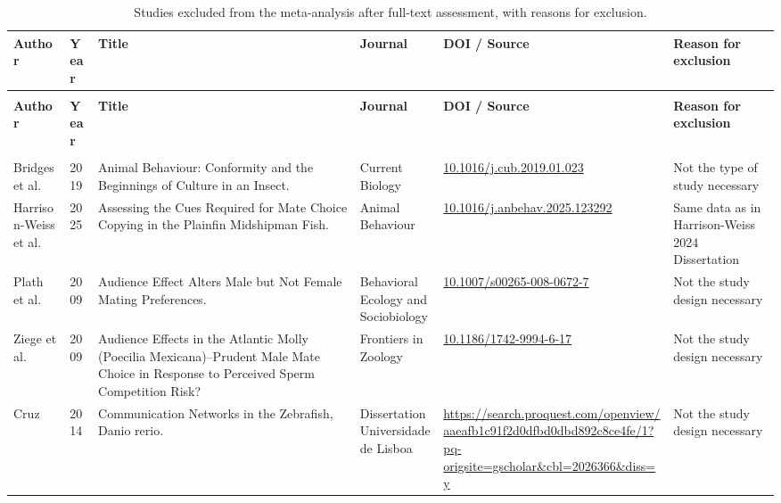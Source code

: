 \begin{landscape}
{\footnotesize
\begin{longtable}{>{\raggedright\arraybackslash}p{2.3cm} l >{\raggedright\arraybackslash}p{4.3cm} >{\raggedright\arraybackslash}p{2.6cm} >{\raggedright\arraybackslash}p{3.0cm} >{\raggedright\arraybackslash}p{2.5cm}}
\caption{Studies excluded from the meta-analysis after full-text assessment, with reasons for exclusion.}\label{tab:excluded}\\
\toprule
\textbf{Author} & \textbf{Year} & \textbf{Title} & \textbf{Journal} & \textbf{DOI / Source} & \textbf{Reason for exclusion} \\
\midrule
\endfirsthead
{}\\
\toprule
\textbf{Author} & \textbf{Year} & \textbf{Title} & \textbf{Journal} & \textbf{DOI / Source} & \textbf{Reason for exclusion} \\
\midrule
\endhead
\midrule
{}\\
\endfoot
\bottomrule
\endlastfoot
Bridges et al. & 2019 & Animal Behaviour: Conformity and the Beginnings of Culture in an Insect. & Current Biology & \url{10.1016/j.cub.2019.01.023} & Not the type of study necessary \\
Harrison-Weiss et al. & 2025 & Assessing the Cues Required for Mate Choice Copying in the Plainfin Midshipman Fish. & Animal Behaviour & \url{10.1016/j.anbehav.2025.123292} & Same data as in Harrison-Weiss 2024 Dissertation \\
Plath et al. & 2009 & Audience Effect Alters Male but Not Female Mating Preferences. & Behavioral Ecology and Sociobiology & \url{10.1007/s00265-008-0672-7} & Not the study design necessary \\
Ziege et al. & 2009 & Audience Effects in the Atlantic Molly (Poecilia Mexicana)--Prudent Male Mate Choice in Response to Perceived Sperm Competition Risk? & Frontiers in Zoology & \url{10.1186/1742-9994-6-17} & Not the study design necessary \\
Cruz & 2014 & Communication Networks in the Zebrafish, Danio rerio. & Dissertation Universidade de Lisboa & \url{https://search.proquest.com/openview/aaeafb1c91f2d0dfbd0dbd892c8ce4fe/1?pq-origsite=gscholar&cbl=2026366&diss=y} & Not the study design necessary \\

\end{longtable}}
\end{landscape}
